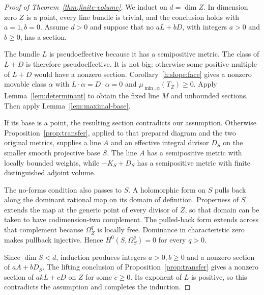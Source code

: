 \begin{proof}[Proof of Theorem~\ref{thm:finite-volume}]
We induct on $d=\dim Z$. In dimension zero $Z$ is a point, every
line bundle is trivial, and the conclusion holds with $a=1,b=0$.
Assume $d>0$ and suppose that no $aL+bD$, with integers $a>0$ and
$b\ge0$, has a section.

The bundle $L$ is pseudoeffective because it has a semipositive metric.
The class of $L+D$ is therefore pseudoeffective. It is not big:
otherwise some positive multiple of $L+D$ would have a nonzero
section. Corollary~\ref{h:slope:face} gives a nonzero movable class
$\alpha$ with $L\cdot\alpha=D\cdot\alpha=0$ and
$\mu_{\min,\alpha}(T_Z)\ge0$. Apply Lemma~\ref{lem:determinant}
to obtain the fixed line $M$ and unbounded sections. Then apply
Lemma~\ref{lem:maximal-base}.

If its base is a point, the resulting section contradicts our
assumption. Otherwise Proposition~\ref{prop:transfer}, applied to
that prepared diagram and the two original metrics, supplies a line
$A$ and an effective integral divisor $D_S$ on the smaller smooth
projective base $S$. The line $A$ has a semipositive metric with
locally bounded weights, while $-K_S+D_S$ has a semipositive metric
with finite distinguished adjoint volume.

The no-forms condition also passes to $S$. A holomorphic form on
$S$ pulls back along the dominant rational map on its domain of
definition. Properness of $S$ extends the map at the generic point
of every divisor of $Z$, so that domain can be taken to have
codimension-two complement. The pulled-back form extends across that
complement because $\Omega_Z^q$ is locally free. Dominance in
characteristic zero makes pullback injective. Hence
$H^0(S,\Omega_S^q)=0$ for every $q>0$.

Since $\dim S<d$, induction produces integers $a>0,b\ge0$ and a
nonzero section of $aA+bD_S$. The lifting conclusion of
Proposition~\ref{prop:transfer} gives a nonzero section of
$akL+cD$ on $Z$ for some $c\ge0$. Its exponent of $L$ is positive,
so this contradicts the assumption and completes the induction.
\end{proof}
